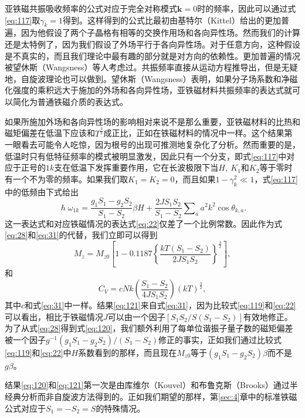 \documentclass{article}
\begin{document}
亚铁磁共振吸收频率的公式对应于完全对称模式$\mathbf{k}=0$时的频率，因此可以通过式\eqref{eq:117}取$\gamma_k=1$得到。这样得到的公式比最初由基特尔（Kittel）给出的更加普遍，因为他假设了两个子晶格有相等的交换作用场和各向异性场。然而我们的计算还是太特例了，因为我们假设了外场平行于各向异性场。对于任意方向，这种假设是不真实的，而且我们理论中最有趣的部分就是对方向的依赖性。更加普遍的情况被望休斯（Wangsness）等人考虑过。共振频率直接从运动方程推导出，但是无疑地，自旋波理论也可以做到。望休斯（Wangsness）表明，如果分子场系数和净磁化强度的乘积远大于施加的外场和各向异性场，亚铁磁材料共振频率的表达式就可以简化为普通铁磁介质的表达式。

如果所施加外场和各向异性场的影响相对来说不是那么重要，亚铁磁材料的比热和磁矩偏差在低温下应该和$T^\frac{3}{2}$成正比，正如在铁磁材料的情况中一样。这个结果第一眼看去可能令人吃惊，因为根号的出现可推测地复杂化了分析。然而重要的是，低温时只有低特征频率的模式被明显激发，因此只有一个分支，即式\eqref{eq:117}中对应于正号的$1k$支在低温下发挥重要作用，它在长波极限下当$H,~K_1$和$K_2$等于零时有一个不为零的频率。如果我们取$K_1=K_2=0$，而且如果$1-\gamma_k^2\ll 1$，式\eqref{eq:117}中的低频由下式给出
\begin{equation} \label{eq:119}
\hslash\omega_{1k}=\frac{g_1S_1-g_2S_2}{S_1-S_2}\beta H+\frac{2JS_1S_2}{S_1-S_2}\sum\nolimits_aa^2k^2\cos\theta_{k,a}.
\end{equation}
这一表达式和对应铁磁情况的表达式\eqref{eq:22}仅差了一个比例常数。因此作为式\eqref{eq:28}和\eqref{eq:31}的代替，我们立即可以得到
\begin{equation} \label{eq:120}
M_z=M_{z0}\left[1-0.1187\left\{\frac{kT(S_1-S_2)}{2JS_1S_2}\right\}^\frac{3}{2}\right],
\end{equation} 
和
\begin{equation} \label{eq:121}
C_V=cNk\left(\frac{S_1-S_2}{4JS_1S_2}\right)(kT)^\frac{3}{2},
\end{equation}
其中$c$和式\eqref{eq:31}中一样。结果\eqref{eq:121}来自式\eqref{eq:31}，因为比较式\eqref{eq:119}和\eqref{eq:22}可以看出，相比于铁磁情况$J$可以由一个因子$[S_1S_2/S(S_1-S_2)]$有效地修正。为了从式\eqref{eq:28}得到式\eqref{eq:120}，我们额外利用了每单位谐振子量子数的磁矩偏差被一个因子$g^{-1}(g_1S_1-g_2S_2)/(S_1-S_2)$修正的事实，正如我们通过比较式\eqref{eq:119}和\eqref{eq:22}中$H$系数看到的那样，而且现在$M_{z0}$等于$(g_1S_1-g_2S_2)\beta$而不是$g\beta$。

结果\eqref{eq:120}和\eqref{eq:121}第一次是由库维尔（Kouvel）和布鲁克斯（Brooks）通过半经典分析而非自旋波方法得到的。正如我们期望的那样，第\ref{sec:4}章中的标准铁磁公式对应于$S_1=-S_2=S$的特殊情况。
\end{document}
